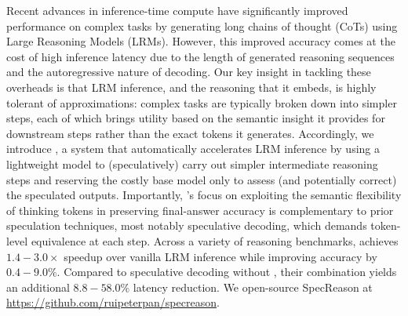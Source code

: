 
Recent advances in inference-time compute have significantly improved performance on complex tasks by generating long chains of thought (CoTs) using Large Reasoning Models (LRMs). However, this improved accuracy comes at the cost of high inference latency due to the length of generated reasoning sequences and the autoregressive nature of decoding. Our key insight in tackling these overheads is that LRM inference, and the reasoning that it embeds, is highly tolerant of approximations: complex tasks are typically broken down into simpler steps, each of which brings utility based on the semantic insight it provides for downstream steps rather than the exact tokens it generates. Accordingly, we introduce \name{}, a system that automatically accelerates LRM inference by using a lightweight model to (speculatively) carry out simpler intermediate reasoning steps and reserving the costly base model only to assess (and potentially correct) the speculated outputs. Importantly, \name{}'s focus on exploiting the semantic flexibility of thinking tokens in preserving final-answer accuracy is complementary to prior speculation techniques, most notably speculative decoding, which demands token-level equivalence at each step. Across a variety of reasoning benchmarks, \name{} achieves $1.4-3.0\times$ speedup over vanilla LRM inference while improving accuracy by $0.4-9.0\%$. Compared to speculative decoding without \name{}, their combination yields an additional $8.8-58.0\%$ latency reduction. We open-source SpecReason at \url{https://github.com/ruipeterpan/specreason}.



